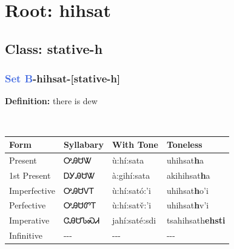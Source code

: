 \needspace{4in}
\section*{Root: hihsat}
\nopagebreak
{}
\needspace{3in}
\subsection*{Class: stative-h}
\nopagebreak
\needspace{2in}
\subsubsection*{\textcolor{RoyalBlue}{Set B}{-}\textbf{hihsat}{-}[stative-h]}
\nopagebreak
\textbf{Definition: } there is dew
\\[0.5em]
\begin{tabularx}{\textwidth}{l X X X}%
\toprule%
\textbf{Form}&\textbf{Syllabary}&\textbf{With Tone}&\textbf{Toneless}\\%
\midrule%
Present&ᎤᎯᏌᏔ&ù:hí:sata&uhihsat\textbf{h}a\\%
1st Present&ᎠᎩᎯᏌᏔ&à:gihí:sata&akihihsat\textbf{h}a\\%
Imperfective&ᎤᎯᏌᏙᎢ&ù:hí:sató:’i&uhihsat\textbf{h}o'i\\%
Perfective&ᎤᎯᏌᏛᎢ&ù:hí:satv̌:’i&uhihsat\textbf{h}v'i\\%
Imperative&ᏣᎯᏌᏖᏍᏗ&jahí:saté:sdi&tsahihsath\textbf{ehsti}\\%
Infinitive&{-}{-}{-}&{-}{-}{-}&{-}{-}{-}\\%
\bottomrule%
\end{tabularx}
\\[1em]